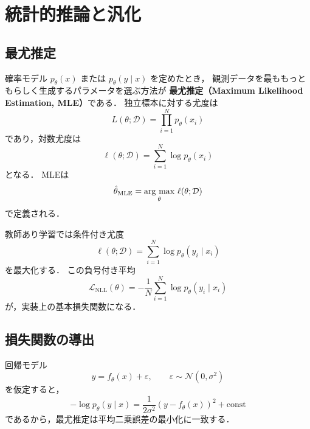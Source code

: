 \section{統計的推論と汎化}
\label{sec:ml-inference}

\subsection{最尤推定}

確率モデル $p_{\theta}(x)$ または $p_{\theta}(y \mid x)$ を定めたとき，
観測データを最ももっともらしく生成するパラメータを選ぶ方法が
\textbf{最尤推定（Maximum Likelihood Estimation, MLE）}である．
独立標本に対する尤度は
\begin{equation}
  L(\theta;\mathcal{D})
  =
  \prod_{i=1}^{N} p_{\theta}(x_i)
  \label{eq:likelihood}
\end{equation}
であり，対数尤度は
\begin{equation}
  \ell(\theta;\mathcal{D})
  =
  \sum_{i=1}^{N} \log p_{\theta}(x_i)
  \label{eq:log-likelihood}
\end{equation}
となる．
MLEは
\begin{equation}
  \hat{\theta}_{\mathrm{MLE}}
  =
  \mathop{\rm arg~max}\limits_{\theta}\,
  \ell(\theta;\mathcal{D})
  \label{eq:mle}
\end{equation}
で定義される．

教師あり学習では条件付き尤度
\begin{equation}
  \ell(\theta;\mathcal{D})
  =
  \sum_{i=1}^{N}\log p_{\theta}(y_i \mid x_i)
  \label{eq:conditional-log-likelihood}
\end{equation}
を最大化する．
この負号付き平均
\begin{equation}
  \mathcal{L}_{\mathrm{NLL}}(\theta)
  =
  -\frac{1}{N}\sum_{i=1}^{N}\log p_{\theta}(y_i \mid x_i)
  \label{eq:nll}
\end{equation}
が，実装上の基本損失関数になる．

\subsection{損失関数の導出}

回帰モデル
\begin{equation}
  y = f_{\theta}(x) + \varepsilon,
  \qquad
  \varepsilon \sim \mathcal{N}(0,\sigma^{2})
  \label{eq:gaussian-regression}
\end{equation}
を仮定すると，
\begin{equation}
  -\log p_{\theta}(y \mid x)
  =
  \frac{1}{2\sigma^{2}}
  \left(
    y-f_{\theta}(x)
  \right)^{2}
  + \mathrm{const}
  \label{eq:mse-derivation}
\end{equation}
であるから，最尤推定は平均二乗誤差の最小化に一致する．

